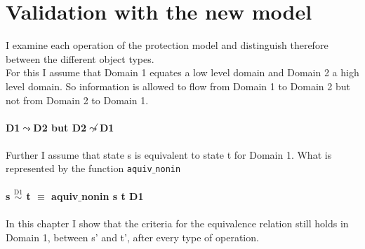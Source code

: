 \documentclass[11pt,a4paper,twoside,BCOR=20mm]{article}
\begin{document}
\section{Validation with the new model}\label{sec:ValNew}
I examine each operation of the protection model and distinguish therefore between the different object types. \\
For this I assume that Domain 1 equates a low level domain and Domain 2 a high level domain. So  information is allowed to flow from Domain 1 to Domain 2 but not from Domain 2 to Domain 1. \\ \\
\textbf{D1$\leadsto$D2 but D2$\not\leadsto$D1} \\ \\
Further I assume that state s is equivalent to state t for Domain 1. What is represented by the function  \texttt{aquiv$\_$nonin} \\ \\
\textbf{s $\overset{\text{D1}}{\sim}$ t $\equiv$ aquiv$\_$nonin s t D1}	\\ \\
In this chapter I show that the criteria for the equivalence relation still holds in Domain 1, between s' and t', after every type of operation. 

\clearpage

\clearpage
 
\clearpage

\clearpage

\clearpage

\clearpage

\clearpage
\end{document}
